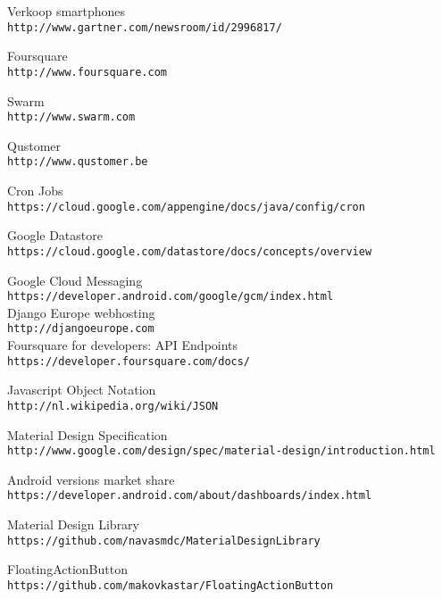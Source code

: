 \begin{thebibliography}{9}

Verkoop smartphones
\\\texttt{http://www.gartner.com/newsroom/id/2996817/}

Foursquare
\\\texttt{http://www.foursquare.com}

Swarm
\\\texttt{http://www.swarm.com}

Qustomer
\\\texttt{http://www.qustomer.be}

Cron Jobs
\\\texttt{https://cloud.google.com/appengine/docs/java/config/cron}

Google Datastore
\\\texttt{https://cloud.google.com/datastore/docs/concepts/overview}

Google Cloud Messaging
\\\texttt{https://developer.android.com/google/gcm/index.html}
\\

Django Europe webhosting
\\\texttt{http://djangoeurope.com}
\\

Foursquare for developers: API Endpoints
\\\texttt{https://developer.foursquare.com/docs/}

Javascript Object Notation
\\\texttt{http://nl.wikipedia.org/wiki/JSON}

Material Design Specification
\\\texttt{http://www.google.com/design/spec/material-design/introduction.html}

Android versions market share
\\\texttt{https://developer.android.com/about/dashboards/index.html}

Material Design Library
\\\texttt{https://github.com/navasmdc/MaterialDesignLibrary}

FloatingActionButton
\\\texttt{https://github.com/makovkastar/FloatingActionButton}


\end{thebibliography}
